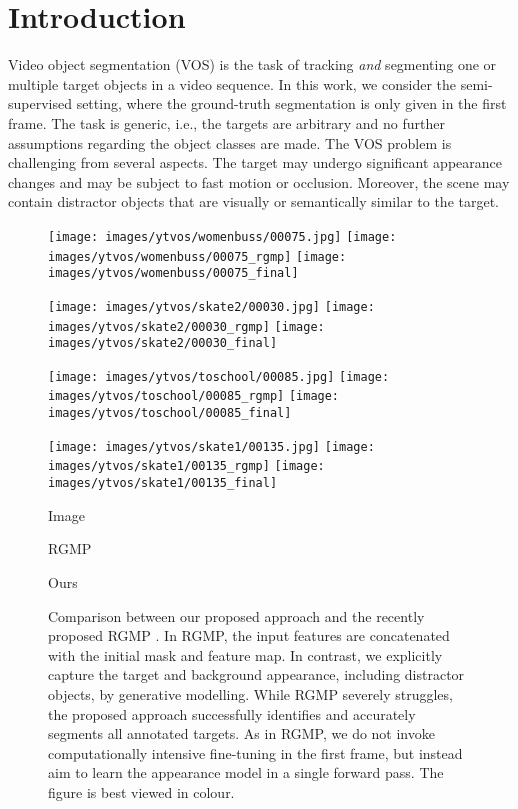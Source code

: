 \documentclass[10pt,twocolumn,letterpaper]{article}
\begin{document}
\section{Introduction}
Video object segmentation (VOS) is the task of tracking \emph{and} segmenting one or multiple target objects in a video sequence. In this work, we consider the semi-supervised setting, where the ground-truth segmentation is only given in the first frame. The task is generic, i.e., the targets are arbitrary and no further assumptions regarding the object classes are made. The VOS problem is challenging from several aspects. The target may undergo significant appearance changes and may be subject to fast motion or occlusion. Moreover, the scene may contain distractor objects that are visually or semantically similar to the target.

\begin{figure}[!t]  
  \texttt{[image: images/ytvos/womenbuss/00075.jpg]}
  \texttt{[image: images/ytvos/womenbuss/00075\_rgmp]}
  \texttt{[image: images/ytvos/womenbuss/00075\_final]}

  \texttt{[image: images/ytvos/skate2/00030.jpg]}
  \texttt{[image: images/ytvos/skate2/00030\_rgmp]}
  \texttt{[image: images/ytvos/skate2/00030\_final]}
  
  \texttt{[image: images/ytvos/toschool/00085.jpg]}
  \texttt{[image: images/ytvos/toschool/00085\_rgmp]}
  \texttt{[image: images/ytvos/toschool/00085\_final]}
  
  \texttt{[image: images/ytvos/skate1/00135.jpg]}
  \texttt{[image: images/ytvos/skate1/00135\_rgmp]}
  \texttt{[image: images/ytvos/skate1/00135\_final]}


  \parbox{.32\columnwidth}{\centering Image}
  \parbox{.32\columnwidth}{\centering RGMP \cite{RGMP}}  
  \parbox{.32\columnwidth}{\centering Ours}

  \caption{Comparison between our proposed approach and the recently proposed RGMP . In RGMP, the input features are concatenated with the initial mask and feature map. In contrast, we explicitly capture the target and background appearance, including distractor objects, by generative modelling. While RGMP severely struggles, the proposed approach successfully identifies and accurately segments all annotated targets. As in RGMP, we do not invoke computationally intensive fine-tuning in the first frame, but instead aim to learn the appearance model in a single forward pass. The figure is best viewed in colour.}
  \label{fig:intro}
\end{figure}
\end{document}
